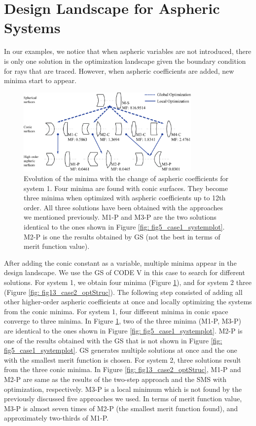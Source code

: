 \section{Design Landscape for Aspheric Systems}
In our examples, we notice that when aspheric variables are not introduced, there is only one solution in the optimization landscape given the boundary condition for rays that are traced. However, when aspheric coefficients are added, new minima start to appear. 

\begin{figure}[h!]
    \centering
    \includegraphics[width=0.8\textwidth]{chapter-5/figures/Fig12_System1_structure.png}
    \caption{Evolution of the minima with the change of aspheric coefficients for system 1. Four minima are found with conic surfaces. They become three minima when optimized with aspheric coefficients up to 12th order. All three solutions have been obtained with the approaches we mentioned previously. M1-P and M3-P are the two solutions identical to the ones shown in Figure \ref{fig: fig5_case1_systemplot}. M2-P is one the results obtained by GS (not the best in terms of merit function value). }
    \label{fig: fig12_case1_optStruc}
\end{figure}

After adding the conic constant as a variable, multiple minima appear in the design landscape. We use the GS of CODE V in this case to search for different solutions. For system 1, we obtain four minima (Figure \ref{fig: fig12_case1_optStruc}), and for system 2 three (Figure \ref{fig: fig13_case2_optStruc}). 
The following step consisted of adding all other higher-order aspheric coefficients at once and locally optimizing the systems from the conic minima. For system 1, four different minima in conic space converge to three minima. In Figure \ref{fig: fig12_case1_optStruc}, two of the three minima (M1-P, M3-P) are identical to the ones shown in Figure \ref{fig: fig5_case1_systemplot}. M2-P is one of the results obtained with the GS that is not shown in Figure \ref{fig: fig5_case1_systemplot}. GS generates multiple solutions at once and the one with the smallest merit function is chosen. For system 2, three solutions result from the three conic minima. In Figure \ref{fig: fig13_case2_optStruc}, M1-P and M2-P are same as the results of the two-step approach and the SMS with optimization, respectively. M3-P is a local minimum which is not found by the previously discussed five approaches we used. In terms of merit function value, M3-P is almost seven times of M2-P (the smallest merit function found), and approximately two-thirds of M1-P.

